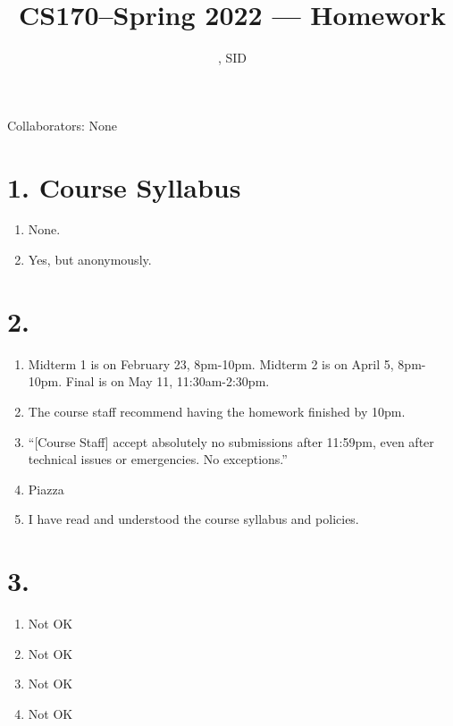 \documentclass[11pt]{article}
\title{CS170--Spring 2022 --- Homework \Homework}
\author{\Name, SID \SID}
\date{}
\newenvironment{qparts}{\begin{enumerate}[{(}a{)}]}{\end{enumerate}}
\begin{document}
\maketitle

Collaborators: None

\section*{1. Course Syllabus}
\begin{qparts}
\item
None.

\item
Yes, but anonymously.
\end{qparts}



\newpage
\section*{2.}
\begin{qparts}
\item
Midterm 1 is on February 23, 8pm-10pm. Midterm 2 is on April 5, 8pm-10pm. Final is on May 11, 11:30am-2:30pm.

\item
The course staff recommend having the homework finished by 10pm.

\item
``[Course Staff] accept absolutely no submissions after 11:59pm, even after technical issues or emergencies. No exceptions.''

\item
Piazza

\item
I have read and understood the course syllabus and policies.

\end{qparts}


\newpage
\section*{3.}
\begin{qparts}
\item
Not OK
\item
Not OK
\item
Not OK
\item
Not OK
\end{qparts}


\newpage
\end{document}
